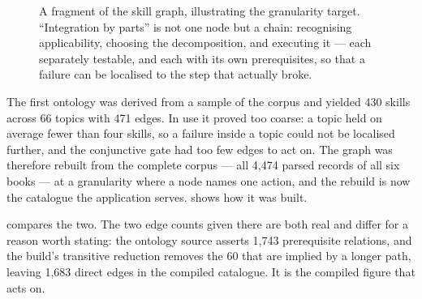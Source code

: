 \begin{figure}[htbp]
  \centering
  \caption{A fragment of the skill graph, illustrating the granularity target.
    ``Integration by parts'' is not one node but a chain: recognising
    applicability, choosing the decomposition, and executing it --- each
    separately testable, and each with its own prerequisites, so that a failure
    can be localised to the step that actually broke.}
  \label{fig:skill-fragment}
\end{figure}

The first ontology was derived from a sample of the corpus and yielded 430
skills across 66 topics with 471 edges. In use it proved too coarse: a topic
held on average fewer than four skills, so a failure inside a topic could not be
localised further, and the conjunctive gate had too few edges to act on. The
graph was therefore rebuilt from the complete corpus --- all 4{,}474 parsed
records of all six books --- at a granularity where a node names one action, and
the rebuild is now the catalogue the application serves. 
shows how it was built.




 compares the two. The two edge counts given there
are both real and differ for a reason worth stating: the ontology source asserts
1{,}743 prerequisite relations, and the build's transitive reduction removes the
60 that are implied by a longer path, leaving 1{,}683 direct edges in the
compiled catalogue. It is the compiled figure that  acts on.

